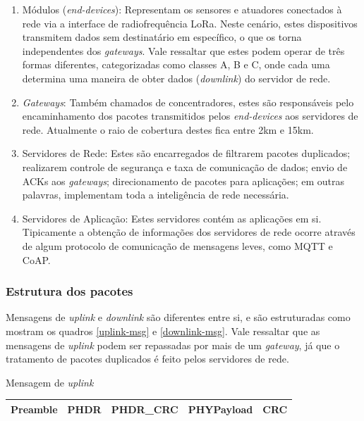 \documentclass[oneside,openright,12pt]{ufsm_2015} %
\begin{document}
\begin{enumerate}
    \item Módulos (\textit{end-devices}): Representam os sensores e atuadores conectados à rede via a interface de radiofrequência LoRa. Neste cenário, estes dispositivos transmitem dados sem destinatário em específico, o que os torna independentes dos \textit{gateways}. Vale ressaltar que estes podem operar de três formas diferentes, categorizadas como classes A, B e C, onde cada uma determina uma maneira de obter dados (\textit{downlink}) do servidor de rede.
    \item \textit{Gateways}: Também chamados de concentradores, estes são responsáveis pelo encaminhamento dos pacotes transmitidos pelos \textit{end-devices} aos servidores de rede. Atualmente o raio de cobertura destes fica entre 2km e 15km.
    \item Servidores de Rede: Estes são encarregados de filtrarem pacotes duplicados; realizarem controle de segurança e taxa de comunicação de dados; envio de ACKs aos \textit{gateways}; direcionamento de pacotes para aplicações; em outras palavras, implementam toda a inteligência de rede necessária.
    \item Servidores de Aplicação: Estes servidores contém as aplicações em si. Tipicamente a obtenção de informações dos servidores de rede ocorre através de algum protocolo de comunicação de mensagens leves, como MQTT e CoAP.
\end{enumerate}

\subsubsection{Estrutura dos pacotes}
Mensagens de \textit{uplink} e \textit{downlink} são diferentes entre si, e são estruturadas como mostram os quadros \ref{uplink-msg} e \ref{downlink-msg}. Vale ressaltar que as mensagens de \textit{uplink} podem ser repassadas por mais de um \textit{gateway}, já que o tratamento de pacotes duplicados é feito pelos servidores de rede.

\begin{quadro}
   	    \caption{Mensagem de \textit{uplink}}
	    \centering
	    \begin{tabular}{| c | c | c | c | c |}
	    \hline
	    Preamble & PHDR & PHDR\_CRC & PHYPayload & CRC \\
	    \hline
	    \end{tabular}
	    \vspace{\baselineskip} %
	    \label{uplink-msg}
\end{quadro}
\end{document}
